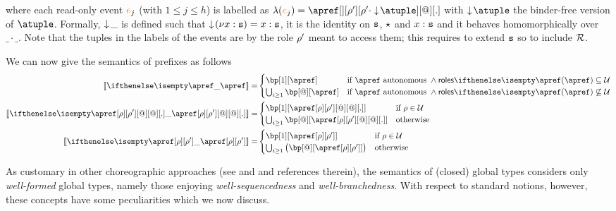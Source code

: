 where each read-only event ${\color{orange}{e}}_j$ (with $1 \leq j \leq h$) is labelled as  
$\alf (\ae_j) = \apref[][\arole'][\arole' \cdot \eraseB\atuple][@][.]$  
%
%
with 
$\eraseB\atuple$ the binder-free version of $\atuple$. 
Formally, $\downarrow\!{\_}$ is defined  such that 
$\downarrow\!{(\nu x:\mathtt{s})} = x : \mathtt{s}$,  it is the identity on $\mathtt{s}$, $\star$ and $x : \mathtt{s}$ and it behaves 
homomorphically over $\_\cdot\_$. 
%
Note that the tuples in the labels of the events are  by the 
role $\rho'$ meant to access  them; this requires to extend $\mathtt{s}$ so to
include  $\mathcal{R}$.



We can now give the semantics of prefixes as follows
\begin{align*}
  \ksem{\apref} =
  &
    \begin{cases}
      \bp[1][\apref]
      & \text{if $\apref$ autonomous } \land \roles{\apref} \subseteq \participants
      \\
      \bigcup_{i \geq 1}\bp[@][\apref]
      & \text{if $\apref$ autonomous } \land \roles{\apref} \not\subseteq \participants
    \end{cases}
  \\
  \ksem{\apref[\arole][\arole'][@][@][.]} =
  &
    \begin{cases}
      \bp[1][{\apref[\arole][\arole'][@][@][.]}]
      & \text{if } \arole \in \participants
      \\
      \bigcup_{i \geq 1}\bp[@][{\apref[\arole][\arole'][@][@][.]}]
      & \text{otherwise}
    \end{cases}
  \\
  \ksem{\apref[\arole][\arole']} =
  &
    \begin{cases}
      \bp[1][{\apref[\arole][\arole']}]
      & \text{if } \arole \in \participants
      \\
      \bigcup_{i \geq 1}\big(\bp[@][{\apref[\arole][\arole']}]\big)
      & \text{otherwise}
    \end{cases}
\end{align*}

As customary in other choreographic approaches (see
\cite{DBLP:journals/csur/HuttelLVCCDMPRT16,dd09} and \cite{gt17} and
references therein), the semantics of (closed) global types considers
only \emph{well-formed} global types, namely those enjoying
\emph{well-sequencedness} and \emph{well-branchedness}.
%
With respect to standard notions, however, these concepts have some
peculiarities which we now discuss.

